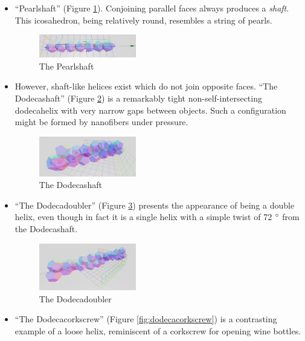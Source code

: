 \documentclass[11pt]{article}
\begin{document}
{\begin{itemize}
\item ``Pearlshaft'' (Figure \ref{fig:pearlshaft}). Conjoining parallel faces always produces a {\em shaft}. This icosahedron, being relatively round,
  resembles a string of pearls.
\begin{figure}
     \centering
     \includegraphics[width=0.40\textwidth]{figures/PearlShaft.png}
     \caption{The Pearlshaft}
  \label{fig:pearlshaft}
\end{figure}

\item However, shaft-like helices exist which do not join opposite faces. ``The Dodecashaft'' (Figure \ref{fig:dodecashaft}) is a remarkably tight
  non-self-intersecting dodecahelix with very narrow gaps between objects.
  Such a configuration
  might be formed by nanofibers under pressure.
\begin{figure}
     \centering
     \includegraphics[width=0.40\textwidth]{figures/Dodecashaft.png}
     \caption{The Dodecashaft}
  \label{fig:dodecashaft}
\end{figure}
\item ``The Dodecadoubler'' (Figure \ref{fig:dodecadoubler}) presents the appearance of being a double helix, even though in fact it is a single helix with
  a simple twist of 72 $\degree$ from the Dodecashaft.
\begin{figure}
     \centering
     \includegraphics[width=0.40\textwidth]{figures/Dodecadoubler.png}
     \caption{The Dodecadoubler}
  \label{fig:dodecadoubler}
\end{figure}
\item ``The Dodecacorkscrew'' (Figure \ref{fig:dodecacorkscrew}) is a contrasting example of a loose helix, reminiscent of a corkscrew for opening wine bottles.
\begin{figure}

\end{figure}
\end{itemize}}
\end{document}
